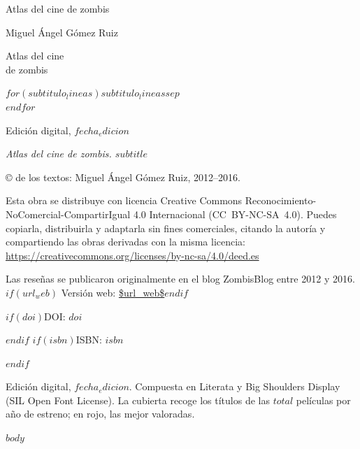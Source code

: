 \documentclass[10pt,twoside,openany]{book}
\begin{document}

\frontmatter
\pagestyle{empty}
\null\vspace{50mm}
{\noindent\display\fontsize{34}{34}\selectfont Atlas del cine de zombis\par}
\clearpage
\null\clearpage
\null\vspace{18mm}
{\noindent\large Miguel Ángel Gómez Ruiz\par}
\vspace{14mm}
{\noindent\raggedright\display\fontsize{52}{46}\selectfont Atlas del cine\\de zombis\par}
\vspace{7mm}
{\noindent\raggedright\displaymedia\fontsize{22}{25}\selectfont $for(subtitulo_lineas)$$subtitulo_lineas$$sep$\\$endfor$\par}
\vfill
{\noindent\small\color{formol} Edición digital, $fecha_edicion$\par}
\clearpage
\null\vfill
{\footnotesize\setlength{\parindent}{0pt}\setlength{\parskip}{.6em}
\textit{Atlas del cine de zombis. $subtitle$}

© de los textos: Miguel Ángel Gómez Ruiz, 2012--2016.

Esta obra se distribuye con licencia Creative Commons Reconocimiento-NoComercial-CompartirIgual 4.0 Internacional (CC~BY-NC-SA~4.0). Puedes copiarla, distribuirla y adaptarla sin fines comerciales, citando la autoría y compartiendo las obras derivadas con la misma licencia: \url{https://creativecommons.org/licenses/by-nc-sa/4.0/deed.es}

Las reseñas se publicaron originalmente en el blog ZombisBlog entre 2012 y 2016.$if(url_web)$ Versión web: \url{$url_web$}$endif$

$if(doi)$DOI: \href{https://doi.org/$doi$}{$doi$}\par$endif$
$if(isbn)$ISBN: $isbn$\par$endif$

Edición digital, $fecha_edicion$. Compuesta en Literata y Big Shoulders Display (SIL Open Font License). La cubierta recoge los títulos de las $total$ películas por año de estreno; en rojo, las mejor valoradas.\par}
\clearpage
\pagestyle{fancy}
\tableofcontents
\clearpage

$body$

\clearpage

\end{document}
